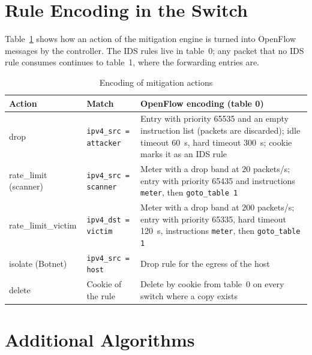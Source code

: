 \section{Rule Encoding in the Switch}
Table~\ref{tab:ruleenc} shows how an action of the mitigation engine is turned into OpenFlow messages by the controller. The IDS rules live in table~0; any packet that no IDS rule consumes continues to table~1, where the forwarding entries are.

\begin{table}[htbp]
\centering
\caption{Encoding of mitigation actions}
\label{tab:ruleenc}
\small
\begin{tabularx}{\textwidth}{|p{2.8cm}|p{3.8cm}|X|}
\hline
\textbf{Action} & \textbf{Match} & \textbf{OpenFlow encoding (table 0)} \\ \hline
drop & \texttt{ipv4\_src = attacker} & Entry with priority 65535 and an empty instruction list (packets are discarded); idle timeout 60~s, hard timeout 300~s; cookie marks it as an IDS rule \\ \hline
rate\_limit (scanner) & \texttt{ipv4\_src = scanner} & Meter with a drop band at 20 packets/s; entry with priority 65435 and instructions \texttt{meter}, then \texttt{goto\_table 1} \\ \hline
rate\_limit\_victim & \texttt{ipv4\_dst = victim} & Meter with a drop band at 200 packets/s; entry with priority 65335, hard timeout 120~s, instructions \texttt{meter}, then \texttt{goto\_table 1} \\ \hline
isolate (Botnet) & \texttt{ipv4\_src = host} & Drop rule for the egress of the host \\ \hline
delete & Cookie of the rule & Delete by cookie from table~0 on every switch where a copy exists \\ \hline
\end{tabularx}
\end{table}

\section{Additional Algorithms}

